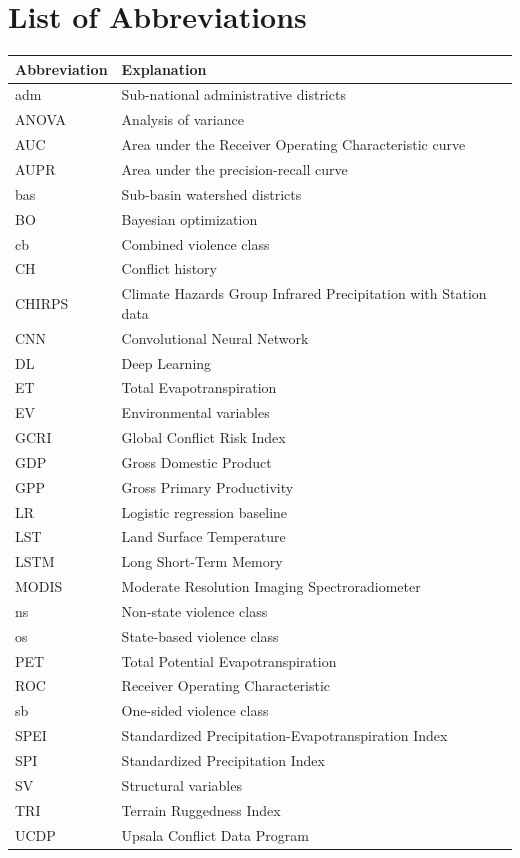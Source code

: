 \documentclass[a4paper,11pt]{article}
\begin{document}
\newpage
\hypertarget{list-of-abbreviations}{%
\section*{List of Abbreviations}\label{list-of-abbreviations}}
\begin{longtable}[]{@{}ll@{}}
\toprule
Abbreviation & Explanation\tabularnewline
\midrule
\endhead
adm & Sub-national administrative districts\tabularnewline
ANOVA & Analysis of variance\tabularnewline
AUC & Area under the Receiver Operating Characteristic curve\tabularnewline
AUPR & Area under the precision-recall curve\tabularnewline
bas & Sub-basin watershed districts\tabularnewline
BO & Bayesian optimization\tabularnewline
cb & Combined violence class\tabularnewline
CH & Conflict history\tabularnewline
CHIRPS & Climate Hazards Group Infrared Precipitation with Station data\tabularnewline
CNN & Convolutional Neural Network\tabularnewline
DL & Deep Learning\tabularnewline
ET & Total Evapotranspiration\tabularnewline
EV & Environmental variables\tabularnewline
GCRI & Global Conflict Risk Index\tabularnewline
GDP & Gross Domestic Product\tabularnewline
GPP & Gross Primary Productivity\tabularnewline
LR & Logistic regression baseline\tabularnewline
LST & Land Surface Temperature\tabularnewline
LSTM & Long Short-Term Memory\tabularnewline
MODIS & Moderate Resolution Imaging Spectroradiometer\tabularnewline
ns & Non-state violence class\tabularnewline
os & State-based violence class\tabularnewline
PET & Total Potential Evapotranspiration\tabularnewline
ROC & Receiver Operating Characteristic\tabularnewline
sb & One-sided violence class\tabularnewline
SPEI & Standardized Precipitation-Evapotranspiration Index\tabularnewline
SPI & Standardized Precipitation Index\tabularnewline
SV & Structural variables\tabularnewline
TRI & Terrain Ruggedness Index\tabularnewline
UCDP & Upsala Conflict Data Program\tabularnewline
\bottomrule
\end{longtable}
\renewcommand{\thetable}{\arabic{table}} \setcounter{table}{0}

\newpage
\listoffigures
{}
\end{document}
